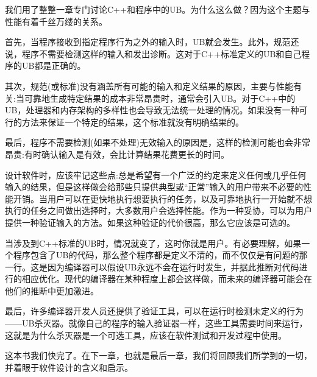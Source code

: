 我们用了整整一章专门讨论C++和程序中的UB。为什么这么做？因为这个主题与性能有着千丝万缕的关系。

首先，当程序接收到指定程序行为之外的输入时，UB就会发生。此外，规范还说，程序不需要检测这样的输入和发出诊断。这对于C++标准定义的UB和自己程序的UB都是正确的。

其次，规范(或标准)没有涵盖所有可能的输入和定义结果的原因，主要与性能有关:当可靠地生成特定结果的成本非常昂贵时，通常会引入UB。对于C++中的UB，处理器和内存架构的多样性也会导致无法统一处理的情况。如果没有一种可行的方法来保证一个特定的结果，这个标准就没有明确结果的。

最后，程序不需要检测(如果不处理)无效输入的原因是，这样的检测可能也会非常昂贵:有时确认输入是有效，会比计算结果花费更长的时间。

设计软件时，应该牢记这些点:总是希望有一个广泛的约定来定义任何或几乎任何输入的结果，但是这样做会给那些只提供典型或“正常”输入的用户带来不必要的性能开销。当用户可以在更快地执行想要执行的任务，以及可靠地执行一开始就不想执行的任务之间做出选择时，大多数用户会选择性能。作为一种妥协，可以为用户提供一种验证输入的方法。如果这种验证的代价很高，那么它应该是可选的。

当涉及到C++标准的UB时，情况就变了，这时你就是用户。有必要理解，如果一个程序包含了UB的代码，那么整个程序都是定义不清的，而不仅仅是有问题的那一行。这是因为编译器可以假设UB永远不会在运行时发生，并据此推断对代码进行的相应优化。现代的编译器在某种程度上都会这样做，而未来的编译器可能会在他们的推断中更加激进。 

最后，许多编译器开发人员还提供了验证工具，可以在运行时检测未定义的行为——UB杀灭器。就像自己的程序的输入验证器一样，这些工具需要时间来运行，这就是为什么杀灭器是一个可选工具，应该在软件测试和开发过程中使用。

这本书我们快完了。在下一章，也就是最后一章，我们将回顾我们所学到的一切，并着眼于软件设计的含义和启示。
